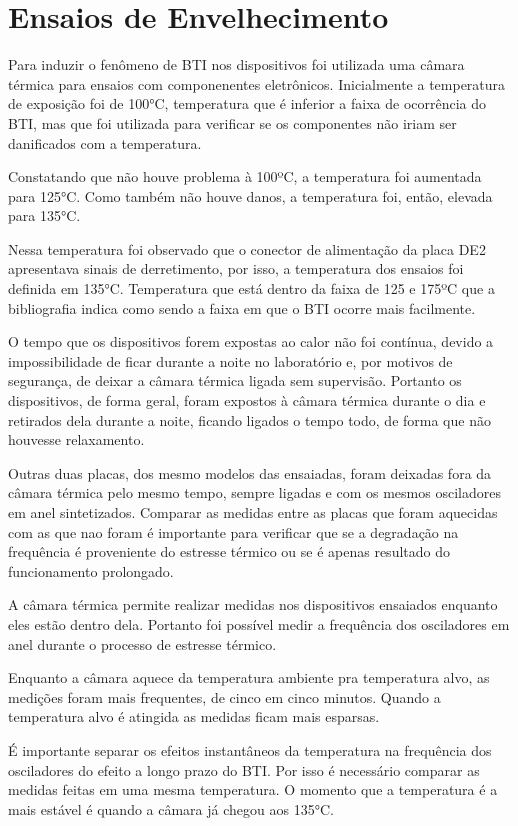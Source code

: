 \section{Ensaios de Envelhecimento}

Para induzir o fenômeno de BTI nos dispositivos foi utilizada uma câmara térmica para ensaios com componenentes eletrônicos. Inicialmente a temperatura de exposição foi de 100°C, temperatura que é inferior a faixa de ocorrência do BTI, mas que foi utilizada para verificar se os componentes não iriam ser danificados com a temperatura.

Constatando que não houve problema à 100ºC, a temperatura foi aumentada para 125°C. Como também não houve danos, a temperatura foi, então, elevada para 135°C.

Nessa temperatura foi observado que o conector de alimentação da placa DE2 apresentava sinais de derretimento, por isso, a temperatura dos ensaios foi definida em 135°C. Temperatura que está dentro da faixa de 125 e 175ºC que a bibliografia indica como sendo a faixa em que o BTI ocorre mais facilmente.

O tempo que os dispositivos forem expostas ao calor não foi contínua, devido a impossibilidade de ficar durante a noite no laboratório e, por motivos de segurança, de deixar a câmara térmica ligada sem supervisão. Portanto os dispositivos, de forma geral, foram expostos à câmara térmica durante o dia e retirados dela durante a noite, ficando ligados o tempo todo, de forma que não houvesse relaxamento.

Outras duas placas, dos mesmo modelos das ensaiadas, foram deixadas fora da câmara térmica pelo mesmo tempo, sempre ligadas e com os mesmos osciladores em anel sintetizados. Comparar as medidas entre as placas que foram aquecidas com as que nao foram é importante para verificar que se a degradação na frequência é proveniente do estresse térmico ou se é apenas resultado do funcionamento prolongado.

A câmara térmica permite realizar medidas nos dispositivos ensaiados enquanto eles estão dentro dela. Portanto foi possível medir a frequência dos osciladores em anel durante o processo de estresse térmico.

Enquanto a câmara aquece da temperatura ambiente pra temperatura alvo, as medições foram mais frequentes, de cinco em cinco minutos. Quando a temperatura alvo é atingida as medidas ficam mais esparsas.

É importante separar os efeitos instantâneos da temperatura na frequência dos osciladores do efeito a longo prazo do BTI. Por isso é necessário comparar as medidas feitas em uma mesma temperatura. O momento que a temperatura é a mais estável é quando a câmara já chegou aos 135°C.

